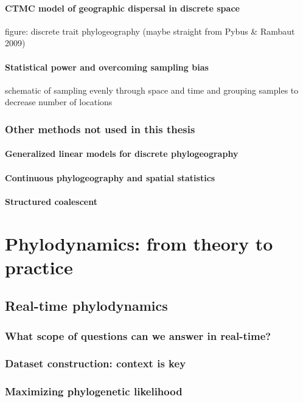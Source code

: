         \paragraph*{CTMC model of geographic dispersal in discrete space}
        figure: discrete trait phylogeography (maybe straight from Pybus \& Rambaut 2009)
        \paragraph*{Statistical power and overcoming sampling bias}
        schematic of sampling evenly through space and time and grouping samples to decrease number of locations

      \subsubsection{Other methods not used in this thesis}

        \paragraph*{Generalized linear models for discrete phylogeography}
        \paragraph*{Continuous phylogeography and spatial statistics}
        \paragraph*{Structured coalescent}

  \section{Phylodynamics: from theory to practice}

    \subsection{Real-time phylodynamics}
      \subsubsection{What scope of questions can we answer in real-time?}
      \subsubsection{Dataset construction: context is key}
      \subsubsection{Maximizing phylogenetic likelihood}
